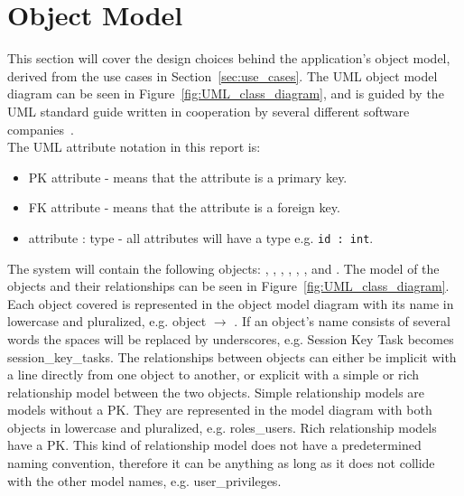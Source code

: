 \section{Object Model}
\label{section:uml_notation}
\label{subsec:objects}

This section will cover the design choices behind the application's object model, derived from the use cases in Section~\ref{sec:use_cases}.
The UML object model diagram can be seen in Figure~\ref{fig:UML_class_diagram}, and is guided by the UML standard guide written in cooperation by several different software companies~\citep{UML_notation}.\\

The UML attribute notation in this report is:
\begin{itemize}
    \item PK attribute - means that the attribute is a primary key.
    \item FK attribute - means that the attribute is a foreign key.
    \item attribute : type - all attributes will have a type e.g. \verb+id : int+.
\end{itemize}

The system will contain the following objects: , , , , , , and .
The model of the objects and their relationships can be seen in Figure~\ref{fig:UML_class_diagram}.
Each object covered is represented in the object model diagram with its name in lowercase and pluralized, e.g.  object $\rightarrow$ .
If an object's name consists of several words the spaces will be replaced by underscores, e.g. Session Key Task becomes session\_key\_tasks.
The relationships between objects can either be implicit with a line directly from one object to another, or explicit with a simple or rich relationship model between the two objects.
Simple relationship models are models without a PK.
They are represented in the model diagram with both objects in lowercase and pluralized, e.g. roles\_users.
Rich relationship models have a PK.
This kind of relationship model does not have a predetermined naming convention, therefore it can be anything as long as it does not collide with the other model names, e.g. user\_privileges.\\

